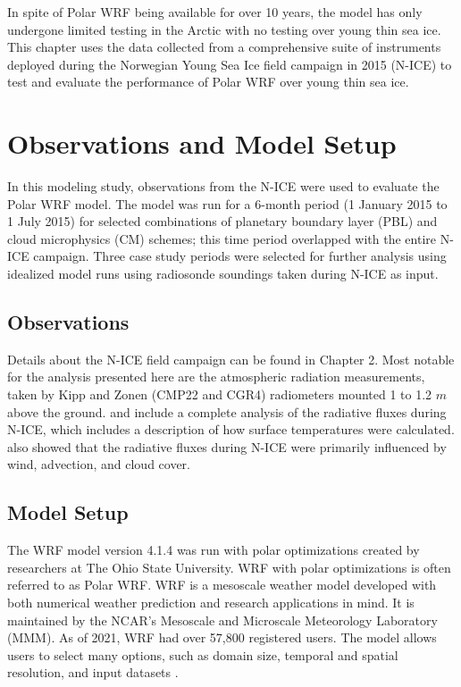 In spite of Polar WRF being available for over 10 years, the model has only undergone limited testing in the Arctic with no testing over young thin sea ice. This chapter uses the data collected from a comprehensive suite of instruments deployed during the Norwegian Young Sea Ice field campaign in 2015 (N-ICE) to test and evaluate the performance of Polar WRF over young thin sea ice. 

\section{Observations and Model Setup}
In this modeling study, observations from the N-ICE were used to evaluate the Polar WRF model. The model was run for a 6-month period (1 January 2015 to 1 July 2015) for selected combinations of planetary boundary layer (PBL) and cloud microphysics (CM) schemes; this time period overlapped with the entire N-ICE campaign. Three case study periods were selected for further analysis using idealized model runs using radiosonde soundings taken during N-ICE as input.

\subsection{Observations}
Details about the N-ICE field campaign can be found in Chapter 2. Most notable for the analysis presented here are the atmospheric radiation measurements, taken by Kipp and Zonen (CMP22 and CGR4) radiometers mounted 1 to 1.2 $m$ above the ground. \citet{granskog:2015} and \citet{walden:2017} include a complete analysis of the radiative fluxes during N-ICE, which includes a description of how surface temperatures were calculated. \citet{walden:2017} also showed that the radiative fluxes during N-ICE were primarily influenced by wind, advection, and cloud cover. 

\subsection{Model Setup}

The WRF model version 4.1.4 was run with polar optimizations created by researchers at The Ohio State University. WRF with polar optimizations is often referred to as Polar WRF. WRF is a mesoscale weather model developed with both numerical weather prediction and research applications in mind. It is maintained by the NCAR's Mesoscale and Microscale Meteorology Laboratory (MMM). As of 2021, WRF had over 57,800 registered users. The model allows users to select many options, such as domain size, temporal and spatial resolution, and input datasets \citep{skamarock:2019}.

